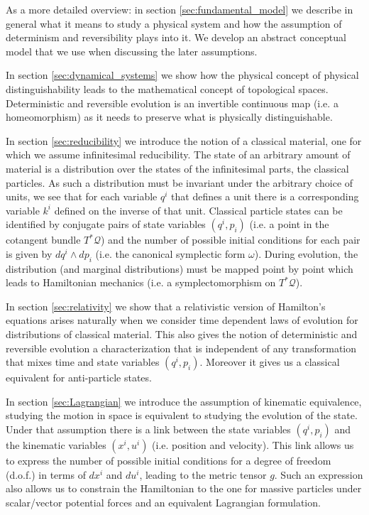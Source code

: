 \documentclass[smallextended]{svjour3}
\numberwithin{equation}{section}
\theoremstyle{definition}
\begin{document}
As a more detailed overview: in section \ref{sec:fundamental_model} we describe in general what it means to study a physical system and how the assumption of determinism and reversibility plays into it. We develop an abstract conceptual model that we use when discussing the later assumptions.

In section \ref{sec:dynamical_systems} we show how the physical concept of physical distinguishability leads to the mathematical concept of topological spaces. Deterministic and reversible evolution is an invertible continuous map (i.e. a homeomorphism) as it needs to preserve what is physically distinguishable.

In section \ref{sec:reducibility} we introduce the notion of a classical material, one for which we assume infinitesimal reducibility. The state of an arbitrary amount of material is a distribution over the states of the infinitesimal parts, the classical particles. As such a distribution must be invariant under the arbitrary choice of units, we see that for each variable $q^i$ that defines a unit there is a corresponding variable $k^i$ defined on the inverse of that unit. Classical particle states can be identified by conjugate pairs of state variables $(q^i, p_i)$ (i.e. a point in the cotangent bundle $T^*\mathcal{Q}$) and the number of possible initial conditions for each pair is given by $dq^i \wedge dp_i$ (i.e. the canonical symplectic form $\omega$). During evolution, the distribution (and marginal distributions) must be mapped point by point which leads to Hamiltonian mechanics (i.e. a symplectomorphism on $T^*\mathcal{Q}$).

In section \ref{sec:relativity} we show that a relativistic version of Hamilton's equations arises naturally when we consider time dependent laws of evolution for distributions of classical material. This also gives the notion of deterministic and reversible evolution a characterization that is independent of any transformation that mixes time and state variables $(q^i, p_i)$. Moreover it gives us a classical equivalent for anti-particle states.

In section \ref{sec:Lagrangian} we introduce the assumption of kinematic equivalence, studying the motion in space is equivalent to studying the evolution of the state. Under that assumption there is a link between the state variables $(q^i, p_i)$ and the kinematic variables $(x^i, u^i)$ (i.e. position and velocity). This link allows us to express the number of possible initial conditions for a degree of freedom (d.o.f.) in terms of $dx^i$ and $du^i$, leading to the metric tensor $g$. Such an expression also allows us to constrain the Hamiltonian to the one for massive particles under scalar/vector potential forces and an equivalent Lagrangian formulation.
\end{document}
